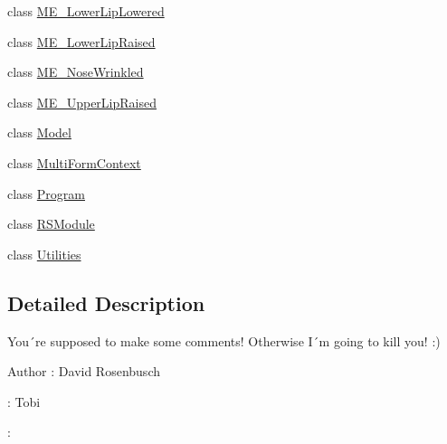 \begin{DoxyCompactItemize}
\item 
class \hyperlink{class_real_sense_1_1_m_e___lower_lip_lowered}{M\+E\+\_\+\+Lower\+Lip\+Lowered}
\item 
class \hyperlink{class_real_sense_1_1_m_e___lower_lip_raised}{M\+E\+\_\+\+Lower\+Lip\+Raised}
\item 
class \hyperlink{class_real_sense_1_1_m_e___nose_wrinkled}{M\+E\+\_\+\+Nose\+Wrinkled}
\item 
class \hyperlink{class_real_sense_1_1_m_e___upper_lip_raised}{M\+E\+\_\+\+Upper\+Lip\+Raised}
\item 
class \hyperlink{class_real_sense_1_1_model}{Model}
\item 
class \hyperlink{class_real_sense_1_1_multi_form_context}{Multi\+Form\+Context}
\item 
class \hyperlink{class_real_sense_1_1_program}{Program}
\item 
class \hyperlink{class_real_sense_1_1_r_s_module}{R\+S\+Module}
\item 
class \hyperlink{class_real_sense_1_1_utilities}{Utilities}
\end{DoxyCompactItemize}


\subsection{Detailed Description}
You´re supposed to make some comments! Otherwise I´m going to kill you! \+:)

\begin{DoxyAuthor}{Author}
\+: David Rosenbusch

\+: Tobi 

\+: 
\end{DoxyAuthor}
